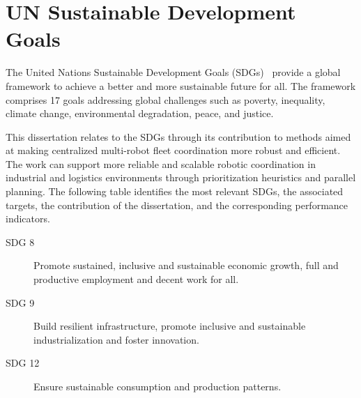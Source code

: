
\chapter*{UN Sustainable Development Goals} \label{chap:UnitedNations}
\hspace{\parindent}
The United Nations Sustainable Development Goals (SDGs)~\cite{un_sdgs} provide a global framework to
achieve a better and more sustainable future for all. The framework comprises 17 goals addressing
global challenges such as poverty, inequality, climate change, environmental degradation, peace,
and justice.

This dissertation relates to the SDGs through its contribution to methods aimed at making
centralized multi-robot fleet coordination more robust and efficient. The work can support more
reliable and scalable robotic coordination in industrial and logistics environments through
prioritization heuristics and
parallel planning. The following table identifies the most relevant SDGs, the associated targets,
the contribution of the dissertation, and the corresponding performance indicators.

\begin{description}
\item [SDG 8]
Promote sustained, inclusive and sustainable economic growth, full and productive employment
and decent work for all.

\item [SDG 9]
Build resilient infrastructure, promote inclusive and sustainable industrialization and foster
innovation.

\item [SDG 12]
Ensure sustainable consumption and production patterns.
\end{description}

